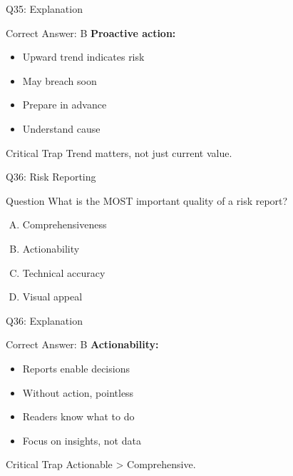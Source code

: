 \documentclass{beamer}
\begin{document}
			\begin{frame}{Q35: Explanation}
				\begin{block}{Correct Answer: B}
					\textbf{Proactive action:}
					\begin{itemize}
						\item Upward trend indicates risk
						\item May breach soon
						\item Prepare in advance
						\item Understand cause
					\end{itemize}
				\end{block}
				\begin{alertblock}{Critical Trap}
					Trend matters, not just current value.
				\end{alertblock}
			\end{frame}
			
			\begin{frame}{Q36: Risk Reporting}
				\begin{block}{Question}
					What is the MOST important quality of a risk report?
				\end{block}
				\begin{enumerate}[(A)]
					\item Comprehensiveness
					\item Actionability
					\item Technical accuracy
					\item Visual appeal
				\end{enumerate}
			\end{frame}
			
			\begin{frame}{Q36: Explanation}
				\begin{block}{Correct Answer: B}
					\textbf{Actionability:}
					\begin{itemize}
						\item Reports enable decisions
						\item Without action, pointless
						\item Readers know what to do
						\item Focus on insights, not data
					\end{itemize}
				\end{block}
				\begin{alertblock}{Critical Trap}
					Actionable > Comprehensive.
				\end{alertblock}
			\end{frame}
			
\end{document}
